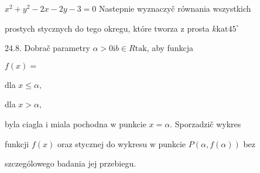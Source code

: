 \documentclass[a4paper,12pt]{article}
\begin{document}
$x^{2}+y^{2}-2x-2y-3=0$ Nastepnie wyznaczyč równania wszystkich

prostych stycznych do tego okregu, które tworza $\mathrm{z}$ prosta $k\mathrm{k}\mathrm{a}\mathrm{t}45^{\circ}$

24.8. Dobrač parametry $\alpha>0 \mathrm{i} b\in R \mathrm{t}\mathrm{a}\mathrm{k}$, aby funkcja

$f(x)=$

dla $x\leq\alpha,$

dla $x>\alpha,$

byla ciagla $\mathrm{i}$ miala pochodna $\mathrm{w}$ punkcie $x =\alpha$. Sporzadzič wykres

funkcji $f(x)$ oraz stycznej do wykresu $\mathrm{w}$ punkcie $P(\alpha,f(\alpha))$ bez

szczególowego badania jej przebiegu.
\end{document}
